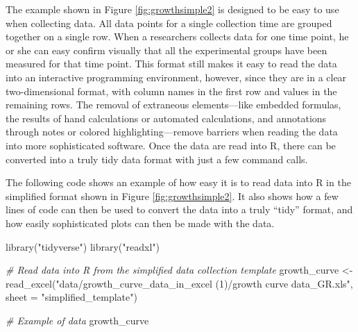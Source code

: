 \documentclass[]{tufte-book}
\newenvironment{Shaded}{}{}
\newcommand{\AttributeTok}[1]{\textcolor[rgb]{0.49,0.56,0.16}{#1}}
\newcommand{\CommentTok}[1]{\textcolor[rgb]{0.38,0.63,0.69}{\textit{#1}}}
\newcommand{\FunctionTok}[1]{\textcolor[rgb]{0.02,0.16,0.49}{#1}}
\newcommand{\NormalTok}[1]{#1}
\newcommand{\OtherTok}[1]{\textcolor[rgb]{0.00,0.44,0.13}{#1}}
\newcommand{\StringTok}[1]{\textcolor[rgb]{0.25,0.44,0.63}{#1}}
\begin{document}
The example shown in Figure \ref{fig:growthsimple2} is designed to be easy to use
when collecting data. All data points for a single collection time are grouped together
on a single row. When a researchers collects data for one time point, he or she can
easy confirm visually that all the experimental groups have been measured for that
time point. This format still makes it easy to read the data into an interactive
programming environment, however, since they are in a clear two-dimensional format,
with column names in the first row and values in the remaining rows. The removal of
extraneous elements---like embedded formulas, the results of hand calculations or
automated calculations, and annotations through notes or colored highlighting---remove
barriers when reading the data into more sophisticated software. Once the data are
read into R, there can be converted into a truly tidy data format with just a few
command calls.

The following code shows an example of how easy it is to read data into R in the simplified
format shown in Figure \ref{fig:growthsimple2}. It also shows how a few lines of code
can then be used to convert the data into a truly ``tidy'' format, and how easily
sophisticated plots can then be made with the data.

\begin{Shaded}
\begin{Highlighting}[]
\FunctionTok{library}\NormalTok{(}\StringTok{"tidyverse"}\NormalTok{)}
\FunctionTok{library}\NormalTok{(}\StringTok{"readxl"}\NormalTok{)}

\CommentTok{\# Read data into R from the simplified data collection template}
\NormalTok{growth\_curve }\OtherTok{\textless{}{-}} \FunctionTok{read\_excel}\NormalTok{(}\StringTok{"data/growth\_curve\_data\_in\_excel (1)/growth curve data\_GR.xls"}\NormalTok{, }
                           \AttributeTok{sheet =} \StringTok{"simplified\_template"}\NormalTok{)}

\CommentTok{\# Example of data}
\NormalTok{growth\_curve}
\end{Highlighting}
\end{Shaded}
\end{document}
